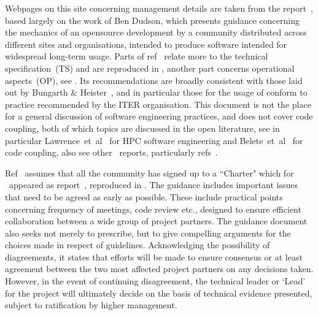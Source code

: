 Webpages on this site concerning management details are taken from the
report~\cite{y3re314}, based largely on the work of Ben Dudson, which
presents guidance concerning the mechanics of an opensource development
by a community distributed  across different sites and organisations,
intended to produce software intended for widespread long-term usage.
Parts of ref~\cite{y3re314} relate more to 
the technical specification~(TS) and are reproduced in ,
another part concerns operational aspects~(OP), see .
Its recommendations are broadly consistent with those laid out by Bungarth \&
Heister~\cite{Ba13What}, and in particular those for the usage of 
conform to practice recommended by the ITER organisation.
This document is not the place for a general discussion of software engineering practices,
and does not cover code coupling, both of which topics are discussed in the open literature,
see in particular Lawrence~et~al~\cite{La18Cros} for HPC software engineering and
Belete~et~al~\cite{Be17over} for code coupling,
also see other \nep \ reports, particularly refs~\cite{y2re312,y2re333,y3re72}.

Ref~\cite{y3re314} assumes that all the community has signed up to a ``Charter"
which for \nep \ appeared as report~\cite{charter}, reproduced in .
The guidance\cite{y3re314}  includes  important issues that need to be agreed as early as possible.
These include practical points concerning frequency of meetings, code review etc.,
designed to ensure efficient collaboration between a wide group of project partners. 
The guidance document\cite{y3re314} also seeks not merely to prescribe, but to
give compelling arguments for the choices made in respect of guidelines.
Acknowledging the possibility of diagreements, it states that efforts will be made to ensure
consensus or at least agreement between the two most affected project partners
on any decisions taken. However, in the event of continuing disagreement, the technical
leader or `Lead' for the project will ultimately decide on the basis of technical
evidence presented, subject to ratification by higher management.

